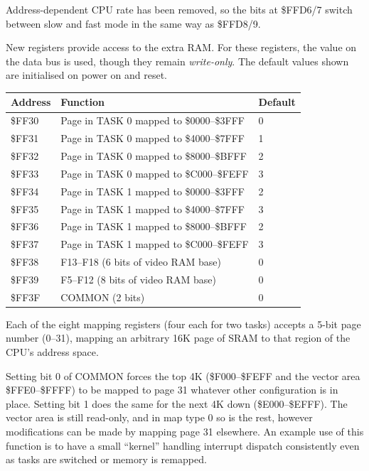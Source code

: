 \documentclass[12pt]{article}
\begin{document}
Address-dependent CPU rate has been removed, so the bits at \$FFD6/7 switch
between slow and fast mode in the same way as \$FFD8/9.

New registers provide access to the extra RAM.  For these registers, the value
on the data bus is used, though they remain \textit{write-only}.  The default
values shown are initialised on power on and reset.

\begin{table}[H]
\small
\centering
\setlength\tabcolsep{4pt}
\begin{tabular}{lll}
Address & Function & Default \\ \hline\rule{0pt}{2.6ex}\rule[-0.9ex]{0pt}{0pt}%
\$FF30 & Page in TASK 0 mapped to \$0000--\$3FFF & 0 \\
\$FF31 & Page in TASK 0 mapped to \$4000--\$7FFF & 1 \\
\$FF32 & Page in TASK 0 mapped to \$8000--\$BFFF & 2 \\
\$FF33 & Page in TASK 0 mapped to \$C000--\$FEFF & 3 \\
\$FF34 & Page in TASK 1 mapped to \$0000--\$3FFF & 2 \\
\$FF35 & Page in TASK 1 mapped to \$4000--\$7FFF & 3 \\
\$FF36 & Page in TASK 1 mapped to \$8000--\$BFFF & 2 \\
\$FF37 & Page in TASK 1 mapped to \$C000--\$FEFF & 3 \\
\$FF38 & F13--F18 (6 bits of video RAM base) & 0 \\
\$FF39 & F5--F12 (8 bits of video RAM base) & 0 \\
\$FF3F & COMMON (2 bits) & 0
\end{tabular}
\end{table}

Each of the eight mapping registers (four each for two tasks) accepts a 5-bit
page number (0--31), mapping an arbitrary 16K page of SRAM to that region of
the CPU's address space.

Setting bit 0 of COMMON forces the top 4K (\$F000--\$FEFF and the vector area
\$FFE0--\$FFFF) to be mapped to page 31 whatever other configuration is in
place.  Setting bit 1 does the same for the next 4K down (\$E000--\$EFFF).  The
vector area is still read-only, and in map type 0 so is the rest, however
modifications can be made by mapping page 31 elsewhere.  An example use of this
function is to have a small ``kernel'' handling interrupt dispatch consistently
even as tasks are switched or memory is remapped.
\end{document}
